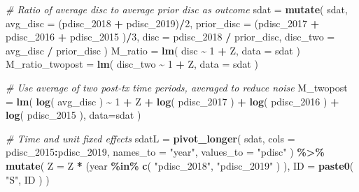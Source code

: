 \documentclass[
]{book}
\newenvironment{Shaded}{\begin{snugshade}}{\end{snugshade}}
\newcommand{\AttributeTok}[1]{\textcolor[rgb]{0.13,0.29,0.53}{#1}}
\newcommand{\CommentTok}[1]{\textcolor[rgb]{0.56,0.35,0.01}{\textit{#1}}}
\newcommand{\DecValTok}[1]{\textcolor[rgb]{0.00,0.00,0.81}{#1}}
\newcommand{\FunctionTok}[1]{\textcolor[rgb]{0.13,0.29,0.53}{\textbf{#1}}}
\newcommand{\NormalTok}[1]{#1}
\newcommand{\OtherTok}[1]{\textcolor[rgb]{0.56,0.35,0.01}{#1}}
\newcommand{\SpecialCharTok}[1]{\textcolor[rgb]{0.81,0.36,0.00}{\textbf{#1}}}
\newcommand{\StringTok}[1]{\textcolor[rgb]{0.31,0.60,0.02}{#1}}
\begin{document}
\begin{Shaded}
\begin{Highlighting}[]
    \CommentTok{\# Ratio of average disc to average prior disc as outcome}
\NormalTok{    sdat }\OtherTok{=} \FunctionTok{mutate}\NormalTok{( sdat,}
                   \AttributeTok{avg\_disc =}\NormalTok{ (pdisc\_2018 }\SpecialCharTok{+}\NormalTok{ pdisc\_2019)}\SpecialCharTok{/}\DecValTok{2}\NormalTok{,}
                   \AttributeTok{prior\_disc =}\NormalTok{ (pdisc\_2017 }\SpecialCharTok{+}\NormalTok{ pdisc\_2016 }\SpecialCharTok{+}\NormalTok{ pdisc\_2015 )}\SpecialCharTok{/}\DecValTok{3}\NormalTok{,}
                   \AttributeTok{disc =}\NormalTok{ pdisc\_2018 }\SpecialCharTok{/}\NormalTok{ prior\_disc,}
                   \AttributeTok{disc\_two =}\NormalTok{ avg\_disc }\SpecialCharTok{/}\NormalTok{ prior\_disc )}
\NormalTok{    M\_ratio }\OtherTok{=} \FunctionTok{lm}\NormalTok{( disc }\SpecialCharTok{\textasciitilde{}} \DecValTok{1} \SpecialCharTok{+}\NormalTok{ Z, }\AttributeTok{data =}\NormalTok{ sdat )}
\NormalTok{    M\_ratio\_twopost }\OtherTok{=} \FunctionTok{lm}\NormalTok{( disc\_two }\SpecialCharTok{\textasciitilde{}} \DecValTok{1} \SpecialCharTok{+}\NormalTok{ Z, }\AttributeTok{data =}\NormalTok{ sdat )}
    
    \CommentTok{\# Use average of two post{-}tx time periods, averaged to reduce noise}
\NormalTok{    M\_twopost }\OtherTok{=} \FunctionTok{lm}\NormalTok{( }\FunctionTok{log}\NormalTok{( avg\_disc ) }\SpecialCharTok{\textasciitilde{}} \DecValTok{1} \SpecialCharTok{+}\NormalTok{ Z }\SpecialCharTok{+} \FunctionTok{log}\NormalTok{( pdisc\_2017 ) }\SpecialCharTok{+} 
                      \FunctionTok{log}\NormalTok{( pdisc\_2016 ) }\SpecialCharTok{+} \FunctionTok{log}\NormalTok{( pdisc\_2015 ), }
                    \AttributeTok{data=}\NormalTok{sdat )}

    \CommentTok{\# Time and unit fixed effects}
\NormalTok{    sdatL }\OtherTok{=} \FunctionTok{pivot\_longer}\NormalTok{( sdat, }\AttributeTok{cols =}\NormalTok{ pdisc\_2015}\SpecialCharTok{:}\NormalTok{pdisc\_2019, }
                          \AttributeTok{names\_to =} \StringTok{"year"}\NormalTok{,}
                          \AttributeTok{values\_to =} \StringTok{"pdisc"}\NormalTok{ ) }\SpecialCharTok{\%\textgreater{}\%}
        \FunctionTok{mutate}\NormalTok{( }\AttributeTok{Z =}\NormalTok{ Z }\SpecialCharTok{*}\NormalTok{ (year }\SpecialCharTok{\%in\%} \FunctionTok{c}\NormalTok{( }\StringTok{"pdisc\_2018"}\NormalTok{, }\StringTok{"pdisc\_2019"}\NormalTok{ ) ),}
                \AttributeTok{ID =} \FunctionTok{paste0}\NormalTok{( }\StringTok{"S"}\NormalTok{, ID ) )}
    

\end{Highlighting}
\end{Shaded}
\end{document}
